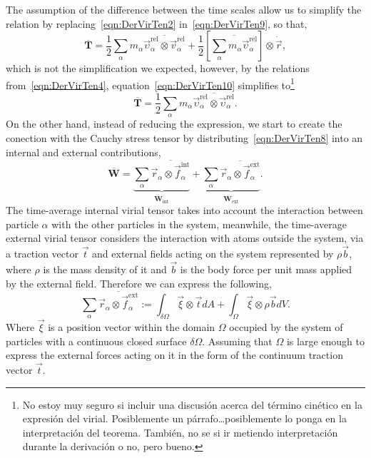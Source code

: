 The assumption of the difference between the time scales allow us to simplify the relation by replacing~\eqref{eqn:DerVirTen2} in~\eqref{eqn:DerVirTen9}, so that,
\begin{equation}
    \overline{\mathbf{T}}=
        \frac{1}{2}\sum_\alpha m_\alpha\overline{\vec{\upsilon}_\alpha^{\mathrm{rel}}\otimes\vec{v}_\alpha^{\mathrm{rel}}}
        +
        \frac{1}{2} \left[\overline{\sum_\alpha m_\alpha\vec{\upsilon}_\alpha^{\mathrm{rel}}}\right]\otimes\dot{\vec{r}}\label{eqn:DerVirTen10},
\end{equation}
which is not the simplification we expected, however, by the relations from~\eqref{eqn:DerVirTen4}, equation~\eqref{eqn:DerVirTen10} simplifies to\footnote{No estoy muy seguro si incluir una discusión acerca del término cinético en la expresión del virial. Posiblemente un párrafo\dots posiblemente lo ponga en la interpretación del teorema.
También, no se si ir metiendo interpretación durante la derivación o no, pero bueno.}
\begin{equation}
    \overline{\mathbf{T}}=
        \frac{1}{2}\sum_\alpha m_\alpha\overline{\vec{\upsilon}_\alpha^{\mathrm{rel}}\otimes\vec{\upsilon}_\alpha^{\mathrm{rel}}}\label{eqn:DerVirTen11}.
\end{equation}
On the other hand, instead of reducing the expression, we start to create the conection with the Cauchy stress tensor by distributing~\eqref{eqn:DerVirTen8} into an internal and external contributions,
\begin{equation}
    \overline{\mathbf{W}} = 
    \underbrace{\sum_\alpha\overline{\vec{r}_\alpha\otimes\vec{f}_\alpha^{\mathrm{int}}}}_{\overline{\mathbf{W}}_{\mathrm{int}}}
        +
        \underbrace{\sum_\alpha\overline{\vec{r}_\alpha\otimes\vec{f}_\alpha^{\mathrm{ext}}}}_{\overline{\mathbf{W}}_{\mathrm{ext}}}.\label{eqn:DerVirTen12}
\end{equation}
The time-average internal virial tensor takes into account the interaction between particle $\alpha$ with the other particles in the system, meanwhile, the time-average external virial tensor considers the interaction with atoms outside the system, via a traction vector $\vec{t}$ and external fields acting on the system represented by $\rho\vec{b}$, where $\rho$ is the mass density of it and $\vec{b}$ is the body force per unit mass applied by the external field.
Therefore we can express the following,
\begin{equation}
    \sum_\alpha\overline{\vec{r}_\alpha\otimes\vec{f}_\alpha^{\mathrm{ext}}}
    :=
    \int_{\delta\Omega}\vec{\xi}\otimes\vec{t}dA 
    +
    \int_{\Omega}\vec{\xi}\otimes\rho\vec{b}dV.\label{eqn:DerVirTen13}
\end{equation}
Where $\vec{\xi}$ is a position vector within the domain $\Omega$ occupied by the system of particles with a continuous closed surface $\delta\Omega$.
Assuming that $\Omega$ is large enough to express the external forces acting on it in the form of the continuum traction vector $\vec{t}$.

